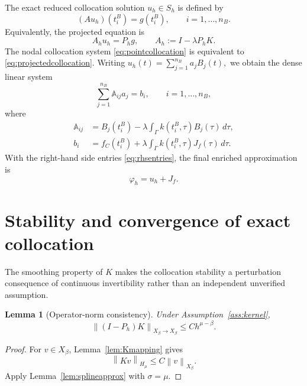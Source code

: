 \documentclass[11pt,a4paper]{amsart}
\theoremstyle{plain}
\newtheorem{lemma}[theorem]{Lemma}
\theoremstyle{definition}
\theoremstyle{remark}
\newcommand{\Ga}{\Gamma}
\newcommand{\norm}[1]{\left\|#1\right\|}
\begin{document}
The exact reduced collocation solution $u_h\in S_h$ is defined by
\begin{equation}\label{eq:pointcollocation}
        (Au_h)(t_i^B)=g(t_i^B),
        \qquad i=1,\ldots,n_B.
\end{equation}
Equivalently, the projected equation is
\begin{equation}\label{eq:projectedcollocation}
        A_hu_h=P_hg,
        \qquad
        A_h:=I-\lambda P_hK.
\end{equation}
The nodal collocation system \eqref{eq:pointcollocation} is equivalent to
\eqref{eq:projectedcollocation}.  Writing
$
        u_h(t)=\sum_{j=1}^{n_B}a_jB_j(t),
$
we obtain the dense linear system
\begin{equation}\label{eq:matrix}
        \sum_{j=1}^{n_B}\mathbb A_{ij}a_j=b_i,
        \qquad i=1,\ldots,n_B,
\end{equation}
where
\begin{align}
        \mathbb A_{ij}
        &=B_j(t_i^B)
          -\lambda\int_\Ga k(t_i^B,\tau)B_j(\tau)\,d\tau,
          \label{eq:matrixentries}\\
        b_i
        &=f_C(t_i^B)
          +\lambda\int_\Ga k(t_i^B,\tau)J_f(\tau)\,d\tau.
          \label{eq:rhsentries}
\end{align}
With the right-hand side entries \eqref{eq:rhsentries}, the final enriched approximation is
\begin{equation}\label{eq:finalapprox}
        \varphi_h=u_h+J_f.
\end{equation}

\section{Stability and convergence of exact collocation}\label{sec:convergence}

The smoothing property of $K$ makes the collocation stability a perturbation consequence of continuous invertibility rather than an independent unverified assumption.

\begin{lemma}[Operator-norm consistency]\label{lem:operatorconsistency}
Under Assumption~\ref{ass:kernel},
\begin{equation}\label{eq:operatorconsistency}
        \norm{(I-P_h)K}_{X_\beta\to X_\beta}
        \le Ch^{\mu-\beta}.
\end{equation}
\end{lemma}

\begin{proof}
For $v\in X_\beta$, Lemma~\ref{lem:Kmapping} gives
\[
        \norm{Kv}_{H_\mu}\le C\norm{v}_{X_\beta}.
\]
Apply Lemma~\ref{lem:splineapprox} with $\sigma=\mu$.
\end{proof}
\end{document}
